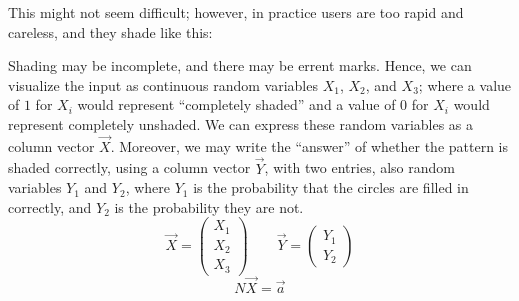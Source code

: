 \documentclass{ximera}
\begin{document}
\begin{example}
\begin{center}
  \end{center}
  This might not seem difficult; however, in practice users are too
  rapid and careless, and they shade like this:
  \begin{center}
  \end{center}
  Shading may be incomplete, and there may be errent marks. Hence, we
  can visualize the input as continuous random variables $X_1$, $X_2$,
  and $X_3$; where a value of $1$ for $X_i$ would represent
  ``completely shaded'' and a value of $0$ for $X_i$ would represent
  completely unshaded. We can express these random variables as a
  column vector $\vec{X}$. Moreover, we may write the ``answer'' of
  whether the pattern is shaded correctly, using a column vector
  $\vec{Y}$, with two entries, also random variables $Y_1$ and $Y_2$,
  where $Y_1$ is the probability that the circles are filled in
  correctly, and $Y_2$ is the probability they are not.
  \[
  \vec{X} = \begin{pmatrix} X_1 \\ X_2 \\ X_3 \end{pmatrix} \qquad \vec{Y} = \begin{pmatrix} Y_1 \\ Y_2 \end{pmatrix}
  \]
  \[
  N \vec{X} = \vec{a}
  \]
  \begin{explanation}
  \end{explanation}
\end{example}
\end{document}
